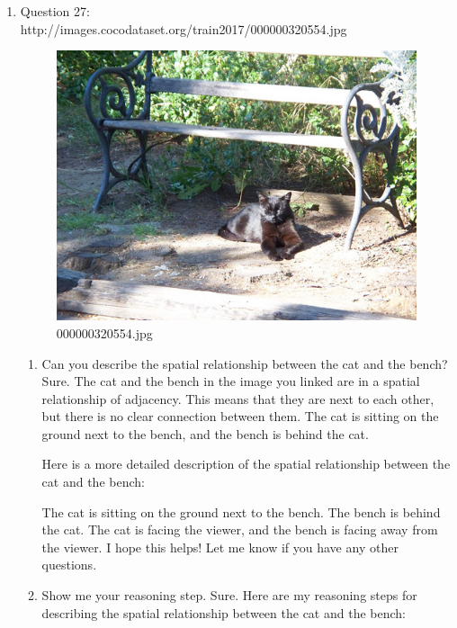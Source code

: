 \begin{enumerate}
\begin{enumerate}
        I hope this explanation is helpful! Let me know if you have any other questions.
    \end{enumerate}
    \item Question 27:\\http://images.cocodataset.org/train2017/000000320554.jpg
    \begin{figure}[h]
        \centering
        \includegraphics[width=0.8\linewidth]{../image set/easy/000000320554.jpg}
        \caption{000000320554.jpg}
    \end{figure}
    \begin{enumerate}
        \item Can you describe the spatial relationship between the cat and the bench?
        \subitem 
        Sure. The cat and the bench in the image you linked are in a spatial relationship of adjacency. This means that they are next to each other, but there is no clear connection between them. The cat is sitting on the ground next to the bench, and the bench is behind the cat.
        
        Here is a more detailed description of the spatial relationship between the cat and the bench:
        
        The cat is sitting on the ground next to the bench.
        The bench is behind the cat.
        The cat is facing the viewer, and the bench is facing away from the viewer.
        I hope this helps! Let me know if you have any other questions.
        \item Show me your reasoning step.
        \subitem 
        Sure. Here are my reasoning steps for describing the spatial relationship between the cat and the bench:
        

\end{enumerate}
\end{enumerate}
